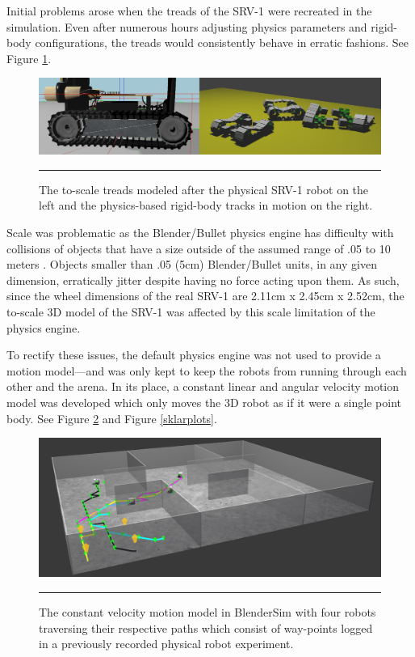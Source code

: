 Initial problems arose when the treads of the SRV-1 were recreated in the simulation. Even after numerous hours adjusting physics parameters and rigid-body configurations, the treads would consistently behave in erratic fashions. See Figure \ref{treads}.

\begin{figure}[htbp]
\centering
\includegraphics[scale=0.25]{../Figures/Chapter5/treads.png}
\rule{35em}{0.5pt}
\caption[Simulated Treads]{The to-scale treads modeled after the physical SRV-1 robot on the left and the physics-based rigid-body tracks in motion on the right.}
\label{treads}
\end{figure}

Scale was problematic as the Blender/Bullet physics engine has difficulty with collisions of objects that have a size outside of the assumed range of .05 to 10 meters \cite{website:bulletscale}. Objects smaller than .05 (5cm) Blender/Bullet units, in any given dimension, erratically jitter despite having no force acting upon them. 
As such, since the wheel dimensions of the real SRV-1 are 2.11cm x 2.45cm x 2.52cm, the to-scale 3D model of the SRV-1 was affected by this scale limitation of the physics engine.

To rectify these issues, the default physics engine was not used to provide a motion model---and was only kept to keep the robots from running through each other and the arena. In its place, a constant linear and angular velocity motion model was developed which only moves the 3D robot as if it were a single point body. See Figure \ref{blendersimrun} and Figure \ref{sklarplots}. 

\begin{figure}[htbp]
\centering
\includegraphics[scale=0.28]{../Figures/Chapter5/const_motion_model.png}
\rule{35em}{0.5pt}
\caption[Constant Velocity Locomotion Model]{The constant velocity motion model in BlenderSim with four robots traversing their respective paths which consist of way-points logged in a previously recorded physical robot experiment.}
\label{blendersimrun}
\end{figure}

